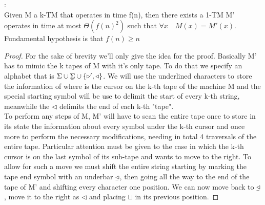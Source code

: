 \begin{theorem}:\\
Given M a k-TM that operates in time f(n), then there exists a 1-TM M' operates in time at most $ \Theta(f(n)^2) $ such that $\forall x \quad M(x) =M'(x)$. Fundamental hypothesis is that $f(n)\geq n$
\begin{proof}
    For the sake of brevity we'll only give the idea for the proof. Basically M' has to mimic the k tapes of M with it's only tape. To do that we specify an alphabet that is $\Sigma \cup \munderbar{\Sigma} \cup \left\{ \triangleright', \triangleleft \right\}$. We will use the underlined characters to store the information of where is the cursor on the k-th tape of the machine M and the special starting symbol will be use to delimit the start of every k-th string, meanwhile the $\triangleleft$ delimits the end of each k-th "tape".\\
    To perform any steps of M, M' will have to scan the entire tape once to store in its state the information about every symbol under the k-th cursor and once more to perform the necessary modifications, needing in total 4 traversals of the entire tape. Particular attention must be given to the case in which the k-th cursor is on the last symbol of its sub-tape and wants to move to the right. To allow for such a move we must shift the entire string starting by marking the tape end symbol with an underbar $\munderbar{\triangleleft}$, then going all the way to the end of the tape of M' and shifting every character one position. We can now move back to $\munderbar{\triangleleft}$, move it to the right as $\triangleleft$ and placing $\sqcup$ in its previous position.
\end{proof}
\end{theorem}

%

